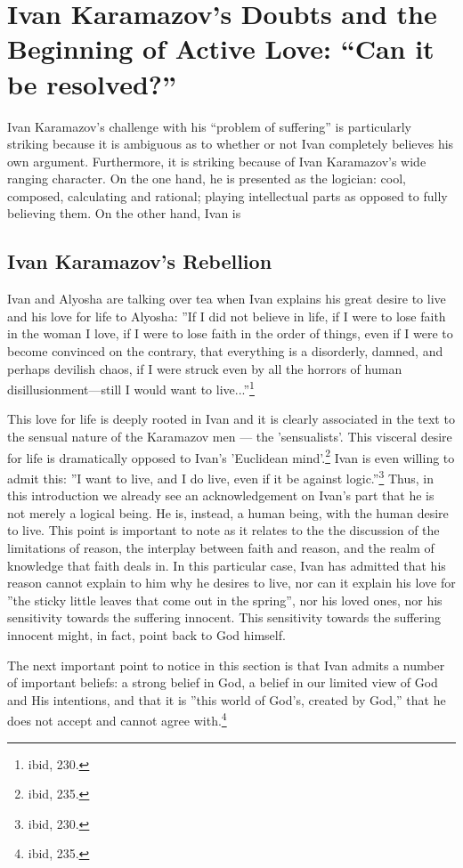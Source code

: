 \chapter{Ivan Karamazov's Doubts and the Beginning of Active Love: ``Can it be resolved?''}
	Ivan Karamazov's challenge with his ``problem of suffering'' is particularly striking because it is ambiguous as to whether or not Ivan completely believes his own argument. Furthermore, it is striking because of Ivan Karamazov's wide ranging character. On the one hand, he is presented as the logician: cool, composed, calculating and rational; playing intellectual parts as opposed to fully believing them. On the other hand, Ivan is 
	\section{Ivan Karamazov's Rebellion}
	Ivan and Alyosha are talking over tea when Ivan explains his great desire to live and his love for life to Alyosha: ''If I did not believe in life, if I were to lose faith in the woman I love, if I were to lose faith in the order of things, even if I were to become convinced on the contrary, that everything is a disorderly, damned, and perhaps devilish chaos, if I were struck even by all the horrors of human disillusionment---still I would want to live...''\footnote{ibid, 230.}
	
	This love for life is deeply rooted in Ivan and it is clearly associated in the text to the sensual nature of the Karamazov men --- the 'sensualists'. This visceral desire for life is dramatically opposed to Ivan's 'Euclidean mind'.\footnote{ibid, 235.} Ivan is even willing to admit this: ''I want to live, and I do live, even if it be against logic.''\footnote{ibid, 230.} Thus, in this introduction we already see an acknowledgement on Ivan's part that he is not merely a logical being. He is, instead, a human being, with the human desire to live. This point is important to note as it relates to the the discussion of the limitations of reason, the interplay between faith and reason, and the realm of knowledge that faith deals in. In this particular case, Ivan has admitted that his reason cannot explain to him why he desires to live, nor can it explain his love for ''the sticky little leaves that come out in the spring'', nor his loved ones, nor his sensitivity towards the suffering innocent. This sensitivity towards the suffering innocent might, in fact, point back to God himself.

The next important point to notice in this section is that Ivan admits a number of important beliefs: a strong belief in God, a belief in our limited view of God and His intentions, and that it is ''this world of God's, created by God,'' that he does not accept and cannot agree with.\footnote{ibid, 235.}
 
